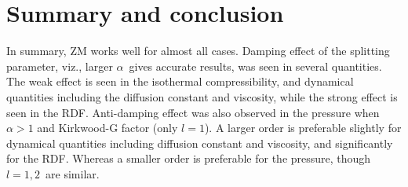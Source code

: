 \documentclass[a4paper,preprint,unsortedaddress,onecolumn,fleqn]{revtex4}
\begin{document}





\section{Summary and conclusion}

In summary, ZM works well for almost all cases. Damping effect of the
splitting parameter, viz., larger $\alpha $\ gives accurate results, was
seen in several quantities. The weak effect is seen in the isothermal
compressibility, {\color{red} } and dynamical quantities including the
diffusion constant and viscosity, while the strong effect is seen in the
RDF. Anti-damping effect was also observed in the pressure when $\alpha >1$
and Kirkwood-G factor (only $l=1$). A larger order is preferable slightly
for dynamical quantities including diffusion constant and viscosity, and
significantly for the RDF. Whereas a smaller order is preferable for the
pressure, though $l=1,2$\ are similar.
\end{document}
